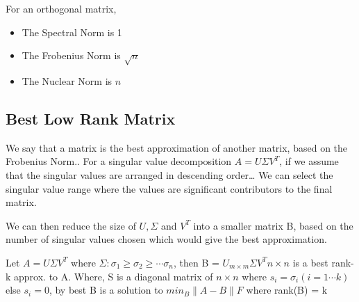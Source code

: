 \documentclass[11pt]{article}
\begin{document}
For an orthogonal matrix,

\begin{itemize}
	\item The Spectral Norm is 1

	\item The Frobenius Norm is \(\sqrt{n}\)

	\item The Nuclear Norm is \({n}\)
\end{itemize}
\subsection{Best Low Rank Matrix}
\label{best-low-rank-matrix}
We say that a matrix is the best approximation of another matrix, based
on the Frobenius Norm.. For a singular value decomposition
\(A = U\Sigma V^T\), if we assume that the singular values are arranged
in descending order\ldots{} We can select the singular value range where the
values are significant contributors to the final matrix.

We can then reduce the size of \(U, \Sigma\) and \(V^T\) into a smaller
matrix B, based on the number of singular values chosen which would give
the best approximation.

Let \(A = U\Sigma V^T\) where
\(\Sigma: \sigma_1 \geq \sigma_2 \geq \cdots \sigma_n\), then B =
\(U_{m\times m} \Sigma V^T{n \times n}\) is a best rank-k approx. to A.
Where, S is a diagonal matrix of \(n \times n\) where
\(s_i = \sigma_i (i = 1\cdots k)\) else \(s_i = 0\), by best B is a
solution to \(min_B \|A - B\|F\) where rank(B) = k
\end{document}
